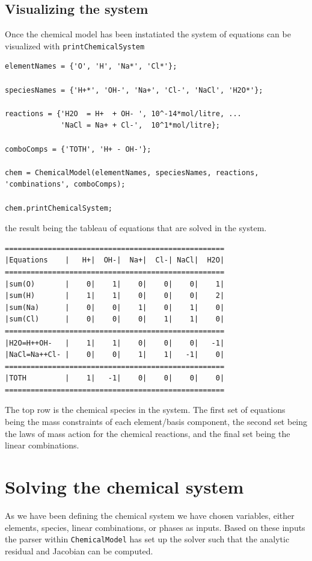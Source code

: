 \documentclass{article}
\begin{document}
\subsection{Visualizing the system}

Once the chemical model has been instatiated the system of equations can be visualized with \verb|printChemicalSystem|

\begin{lstlisting}
elementNames = {'O', 'H', 'Na*', 'Cl*'};

speciesNames = {'H+*', 'OH-', 'Na+', 'Cl-', 'NaCl', 'H2O*'};

reactions = {'H2O  = H+  + OH- ', 10^-14*mol/litre, ...
             'NaCl = Na+ + Cl-',  10^1*mol/litre};

comboComps = {'TOTH', 'H+ - OH-'};

chem = ChemicalModel(elementNames, speciesNames, reactions, 'combinations', comboComps);

chem.printChemicalSystem;
\end{lstlisting}
the result being the tableau of equations that are solved in the system.

\begin{lstlisting}
===================================================
|Equations    |   H+|  OH-|  Na+|  Cl-| NaCl|  H2O|
===================================================
|sum(O)       |    0|    1|    0|    0|    0|    1|
|sum(H)       |    1|    1|    0|    0|    0|    2|
|sum(Na)      |    0|    0|    1|    0|    1|    0|
|sum(Cl)      |    0|    0|    0|    1|    1|    0|
===================================================
|H2O=H++OH-   |    1|    1|    0|    0|    0|   -1|
|NaCl=Na++Cl- |    0|    0|    1|    1|   -1|    0|
===================================================
|TOTH         |    1|   -1|    0|    0|    0|    0|
===================================================
\end{lstlisting}
The top row is the chemical species in the system. The first set of equations being the mass constraints of each element/basis component, the second set being the laws of mass action for the chemical reactions, and the final set being the linear combinations. 


\section{Solving the chemical system}
As we have been defining the chemical system we have chosen variables, either elements, species, linear combinations, or phases as inputs. Based on these inputs the parser within \verb|ChemicalModel| has set up the solver such that the analytic residual and Jacobian can be computed.
\end{document}
